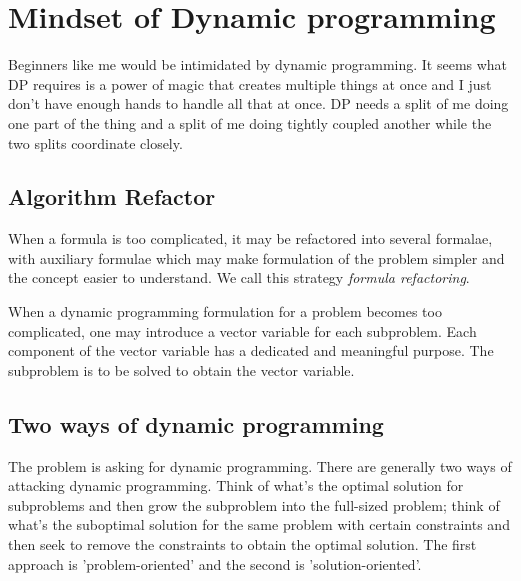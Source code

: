 
\chapter{Mindset of Dynamic programming} \label{ch:dp}

Beginners like me would be intimidated by dynamic programming.
It seems what DP requires is a power of magic that creates multiple things at once and I just don't
have enough hands to handle all that at once.
DP needs a split of me doing one part of the thing and a split of me doing tightly coupled another
while the two splits coordinate closely.

\section{Algorithm Refactor}\label{sec:algorithmRefactor}

\begin{defn}
    When a formula is too complicated, it may be refactored into several formalae, with auxiliary
    formulae which may make formulation of the problem simpler and the concept easier to understand.
    We call this strategy \emph{formula refactoring}.
\end{defn}

\begin{defn}
    When a dynamic programming formulation for a problem becomes too complicated, one may
    introduce a vector variable for each subproblem.
    Each component of the vector variable has a dedicated and meaningful purpose.
    The subproblem is to be solved to obtain the vector variable.
\end{defn}

\section{Two ways of dynamic programming}\label{sec:twoWaysOfDynamicProgramming}

The problem is asking for dynamic programming.
There are generally two ways of attacking dynamic programming.
Think of what's the optimal solution for subproblems and then grow the subproblem into the
full-sized problem;
think of what's the suboptimal solution for the same problem with certain
constraints and then seek to remove the constraints to obtain the optimal solution.
The first approach is 'problem-oriented' and the second is 'solution-oriented'.

